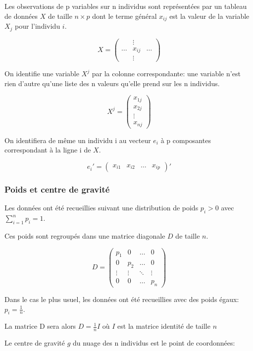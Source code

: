 \documentclass[12pt,a4paper]{article}
\begin{document}
Les observations de p variables sur n individus sont représentées par un tableau de données $X$ de taille $n \times p$ dont le terme général $x_{ij}$ est la valeur de la variable $X_j$ pour l'individu $i$.

\[X = 
\begin{pmatrix}
& \vdots &  \\
\dots & x_{ij} & \dots \\
& \vdots & 
\end{pmatrix}
\]

On identifie une variable $X^{j}$ par la colonne correspondante: une variable n'est rien d'autre qu'une liste des n valeurs qu'elle prend sur les n individus.

\[ X^j = \begin{pmatrix} x_{1j} \\ x_{2j} \\ \vdots \\ x_{nj} \end{pmatrix} \]

On identifiera de même un individu i au vecteur $e_i$ à p composantes correspondant à la ligne i de $X$.

\[ e_i' = \begin{pmatrix} x_{i1} & x_{i2} & \dots & x_{ip} \end{pmatrix}' \]

\subsubsection{Poids et centre de gravité}

Les données ont été recueillies suivant une distribution de poids $p_i > 0$ avec $\sum_{i=1}^n p_i = 1$.

Ces poids sont regroupés dans une matrice diagonale $D$ de taille $n$.

\[D = 
\begin{pmatrix}
p_1 & 0 & \dots & 0 \\
0 & p_2 & \dots & 0 \\
\vdots & \vdots & \ddots & \vdots \\
0 & 0 & \dots & p_n
\end{pmatrix}
\]

Dans le cas le plus usuel, les données ont été recueillies avec des poids égaux: $p_i = \frac{1}{n}$.

La matrice D sera alors $D = \frac{1}{n} I $ où $I$ est la matrice identité de taille $n$

Le centre de gravité $g$ du nuage des n individus est le point de coordonnées:
\end{document}
